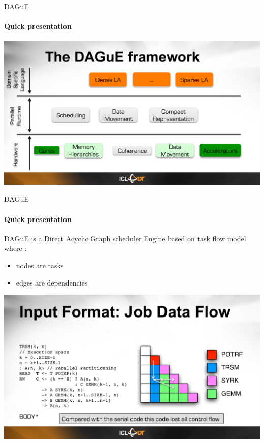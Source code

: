 \begin{frame}{DAGuE}
\framesubtitle{Quick presentation}
\begin{center}
\includegraphics[scale=0.5]{3layer.pdf}
\end{center}
\end{frame}

\begin{frame}{DAGuE}
\framesubtitle{Quick presentation}
DAGuE is a Direct Acyclic Graph scheduler Engine based on task flow model where :
\begin{itemize}
\item nodes are tasks
\item edges are dependencies
\end{itemize}
\begin{center}
\includegraphics[scale=0.5]{trsm.pdf}
\end{center}
\end{frame}

